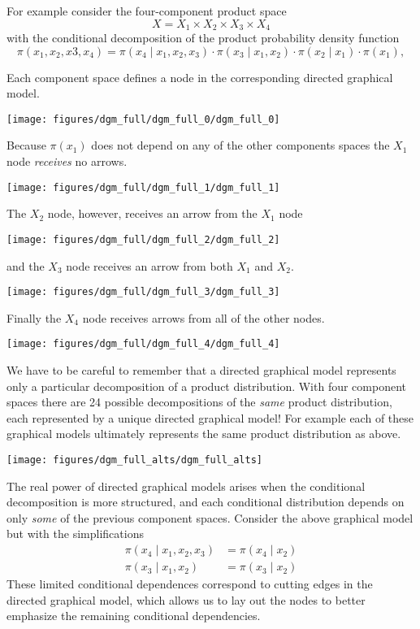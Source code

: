 \documentclass[]{article}
\begin{document}
For example consider the four-component product space \[
X = X_{1} \times X_{2} \times X_{3} \times X_{4}
\] with the conditional decomposition of the product probability density
function \[
\pi(x_{1}, x_{2}, x{3}, x_{4})
=
\pi(x_{4} \mid x_{1}, x_{2}, x_{3}) \cdot \pi(x_{3} \mid x_{1}, x_{2}) \cdot
\pi(x_{2} \mid x_{1}) \cdot \pi(x_{1}),
\]

Each component space defines a node in the corresponding directed
graphical model.

\texttt{[image: figures/dgm\_full/dgm\_full\_0/dgm\_full\_0]}

Because \(\pi(x_{1})\) does not depend on any of the other components
spaces the \(X_{1}\) node \emph{receives} no arrows.

\texttt{[image: figures/dgm\_full/dgm\_full\_1/dgm\_full\_1]}

The \(X_{2}\) node, however, receives an arrow from the \(X_{1}\) node

\texttt{[image: figures/dgm\_full/dgm\_full\_2/dgm\_full\_2]}

and the \(X_{3}\) node receives an arrow from both \(X_{1}\) and
\(X_{2}\).

\texttt{[image: figures/dgm\_full/dgm\_full\_3/dgm\_full\_3]}

Finally the \(X_{4}\) node receives arrows from all of the other nodes.

\texttt{[image: figures/dgm\_full/dgm\_full\_4/dgm\_full\_4]}

We have to be careful to remember that a directed graphical model
represents only a particular decomposition of a product distribution.
With four component spaces there are 24 possible decompositions of the
\emph{same} product distribution, each represented by a unique directed
graphical model! For example each of these graphical models ultimately
represents the same product distribution as above.

\texttt{[image: figures/dgm\_full\_alts/dgm\_full\_alts]}

The real power of directed graphical models arises when the conditional
decomposition is more structured, and each conditional distribution
depends on only \emph{some} of the previous component spaces. Consider
the above graphical model but with the simplifications \[
\begin{aligned}
\pi(x_{4} \mid x_{1}, x_{2}, x_{3}) &= \pi(x_{4} \mid x_{2})
\\
\pi(x_{3} \mid x_{1}, x_{2}) &= \pi(x_{3} \mid x_{2})
\end{aligned}
\] These limited conditional dependences correspond to cutting edges in
the directed graphical model, which allows us to lay out the nodes to
better emphasize the remaining conditional dependencies.
\end{document}
